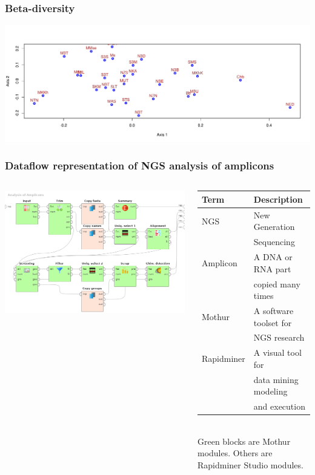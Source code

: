 \documentclass[10pt]{beamer}
\begin{document}
\begin{frame}
  \frametitle{Beta-diversity}
  \includegraphics[width=1\linewidth]{nmds.pdf}
\end{frame}

\begin{frame}
  \frametitle{Dataflow representation of NGS analysis of amplicons}
  \begin{columns}
    \begin{column}{0.6\textwidth}
      \begin{raggedright}
        \includegraphics[width=1\linewidth]{Dataflow-color-en.png}
      \end{raggedright}
    \end{column}
    \begin{column}{0.4\textwidth}\footnotesize
      \begin{tabular}{ll}
        Term & Description \\
        \hline
        NGS & New Generation\\ & Sequencing\\
        Amplicon & A DNA or RNA part \\
                 & copied many times \\
        Mothur & A software toolset for\\ & NGS research \\
        Rapidminer & A visual tool for \\
             & data mining modeling\\
             &  and execution
      \end{tabular}
      ${}$\\[1em]
      Green blocks are Mothur modules. Others are Rapidminer Studio modules.
    \end{column}
  \end{columns}
\end{frame}
\end{document}
